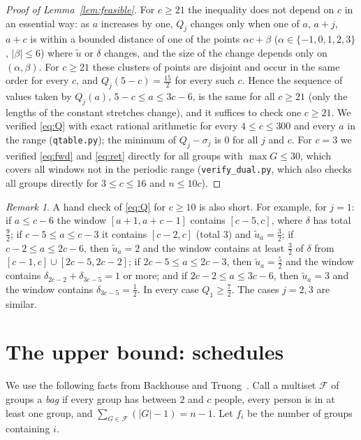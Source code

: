 \documentclass[11pt]{article}
\theoremstyle{remark}
\newtheorem{remark}[theorem]{Remark}
\begin{document}
\begin{proof}[Proof of Lemma~\ref{lem:feasible}]
For $c\ge21$ the inequality does not depend on $c$ in an essential way: as $a$ increases by one, $Q_j$ changes only when one of $a$, $a+j$, $a+c$ is within a bounded distance of one of the points $\alpha c+\beta$ ($\alpha\in\{-1,0,1,2,3\}$, $|\beta|\le 6$) where $\tilde u$ or $\delta$ changes, and the size of the change depends only on $(\alpha,\beta)$. For $c\ge 21$ these clusters of points are disjoint and occur in the same order for every $c$, and $Q_j(5-c)=\frac{15}2$ for every such $c$. Hence the sequence of values taken by $Q_j(a)$, $5-c\le a\le 3c-6$, is the same for all $c\ge21$ (only the lengths of the constant stretches change), and it suffices to check one $c\ge21$. We verified \eqref{eq:Q} with exact rational arithmetic for every $4\le c\le 300$ and every $a$ in the range (\texttt{qtable.py}); the minimum of $Q_j-\sigma_j$ is $0$ for all $j$ and $c$. For $c=3$ we verified \eqref{eq:fwd} and \eqref{eq:ret} directly for all groups with $\max G\le 30$, which covers all windows not in the periodic range (\texttt{verify\_dual.py}, which also checks all groups directly for $3\le c\le16$ and $n\le10c$).
\end{proof}

\begin{remark}
A hand check of \eqref{eq:Q} for $c\ge10$ is also short. For example, for $j=1$: if $a\le c-6$ the window $[a+1,a+c-1]$ contains $[c-5,c]$, where $\delta$ has total $\frac92$; if $c-5\le a\le c-3$ it contains $[c-2,c]$ (total $3$) and $\tilde u_a=\frac32$; if $c-2\le a\le 2c-6$, then $\tilde u_a=2$ and the window contains at least $\frac32$ of $\delta$ from $[c-1,c]\cup[2c-5,2c-2]$; if $2c-5\le a\le 2c-3$, then $\tilde u_a=\frac52$ and the window contains $\delta_{2c-2}+\delta_{3c-5}=1$ or more; and if $2c-2\le a\le 3c-6$, then $\tilde u_a=3$ and the window contains $\delta_{3c-5}=\frac12$. In every case $Q_1\ge\frac72$. The cases $j=2,3$ are similar.
\end{remark}

\section{The upper bound: schedules}

We use the following facts from Backhouse and Truong~\cite{bt15}. Call a multiset $\mathcal F$ of groups a \emph{bag} if every group has between $2$ and $c$ people, every person is in at least one group, and $\sum_{G\in\mathcal F}(|G|-1)=n-1$. Let $f_i$ be the number of groups containing $i$.
\end{document}
